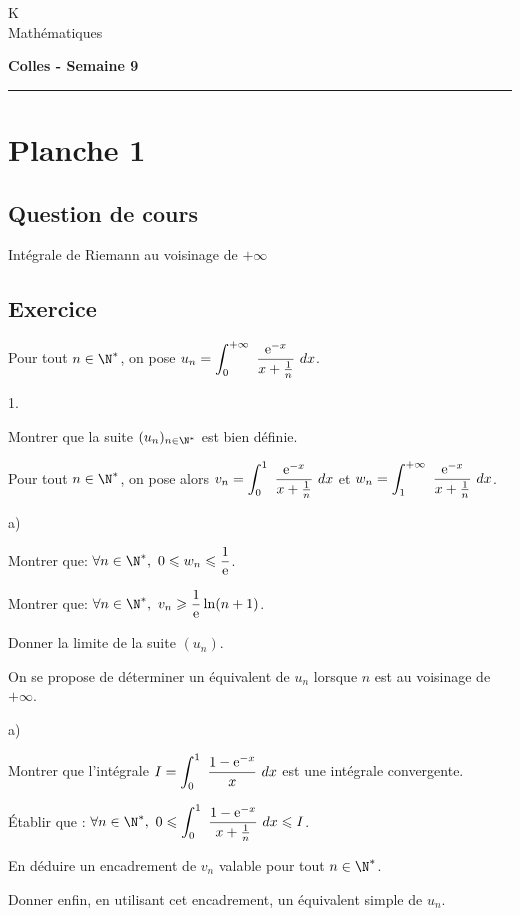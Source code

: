 \documentclass[11pt]{article}%
\begin{document}
\begin{flushleft}
K \\
Mathématiques
\end{flushleft}

\begin{center}
\textbf{\Large{Colles - Semaine 9}}
\end{center}

\hrule

\vspace*{0,2cm}

\section*{Planche 1}

\subsection*{Question de cours}

\noindent
Intégrale de Riemann au voisinage de $+\infty$


\subsection*{Exercice}

\noindent
Pour tout $n\in\N^{*}$, on pose $
u_{n} = \displaystyle \int_{0}^{+\infty}\ \dfrac{\text{e}^{-x}}{x+\frac{1}{n}}\ dx$.

\begin{noliste}{1.}
\item Montrer que la suite $(u_{n})_{n\in\N^{*}}$ est bien définie.
\item Pour tout $n\in\N^{*}$, on pose alors $
v_{n}=\displaystyle \int_{0}^{1}\ \dfrac{\text{e}^{-x}}{x+\frac{1}{n}}\ dx$
et $w_{n}=\displaystyle \int_{1}^{+\infty}\ \dfrac{\text{e}^{-x}}{x+\frac{1}{n}}\ dx$.

\begin{noliste}{a)}
\item Montrer que: $\forall n\in\N^{*}, \ 0\leq w_{n} \leq \dfrac{1}{\ee}$.
\item Montrer que: $\forall n\in\N^{*},\ v_{n}\geq \dfrac{1}{\ee}\ln(n+1)$.
\item Donner la limite de la suite $(u_{n})$.
\end{noliste}
\item On se propose de déterminer un équivalent de $u_{n}$ lorsque $n$
est au voisinage de $+\infty$.

\begin{noliste}{a)}
\item Montrer que l'intégrale $I=\displaystyle \int_{0}^{1}\ \dfrac{1-\text{e}^{-x}}{x} \ dx$
est une intégrale convergente.
\item Établir que : $\forall n \in \N^{*}, \ 0 \leq \dint{0}{1} 
\dfrac{1-\ee^{-x}}{x+\frac{1}{n}} \dx \leq I$.
\item En déduire un encadrement de $v_{n}$ valable pour tout 
$n\in\N^{*}$.
\item Donner enfin, en utilisant cet encadrement, un équivalent simple 
de $u_{n}$.
\end{noliste}
\end{noliste}
\end{document}
